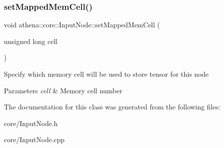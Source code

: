 \subsubsection{\texorpdfstring{set\+Mapped\+Mem\+Cell()}{setMappedMemCell()}}
{\footnotesize\ttfamily void athena\+::core\+::\+Input\+Node\+::set\+Mapped\+Mem\+Cell (\begin{DoxyParamCaption}\item[{unsigned long}]{cell }\end{DoxyParamCaption})}

Specify which memory cell will be used to store tensor for this node 
\begin{DoxyParams}{Parameters}
{\em cell} & Memory cell number \\
\hline
\end{DoxyParams}


The documentation for this class was generated from the following files\+:\begin{DoxyCompactItemize}
\item 
core/Input\+Node.\+h\item 
core/Input\+Node.\+cpp\end{DoxyCompactItemize}
